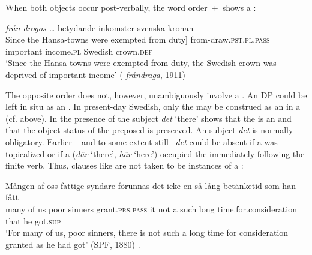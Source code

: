 \documentclass[output=paper]{langscibook}
\begin{document}
When both objects occur post-verbally, the word order \,+\, shows a :

\ea%
    \label{ex:falk:10}
    \gll {{\ob}Genom Hansestädernas tullfrihet]} \textit{från-drogos …} betydande   inkomster  svenska    kronan \\
    {{\ob}Since the Hansa-towns were exempted from duty]}   from-draw\textsc{.pst.pl}.\textsc{pass}    important   income\textsc{.pl}  Swedish   crown.\textsc{def}\\
\glt ‘Since the Hansa-towns were exempted from duty, the Swedish crown was deprived of important income’ ( \textit{fråndraga}, 1911)
\z


The opposite order does not, however, unambiguously involve a . An  DP could be left in situ as an . In present-day Swedish, only the  may be construed as an  in a  (cf.  above). In  the presence of {the  subject \textit{det} ‘there’} shows that the  is an  and that the object status of the preposed  is preserved. An  subject \textit{det} is normally obligatory. Earlier – and to some extent still– \textit{det} could be absent if a  was topicalized or if a   (\textit{där} ‘there’, \textit{här} ‘here’) occupied the  immediately following the finite verb. Thus, clauses like  are not taken to be instances of a :

\ea%
    \label{ex:falk:11}
\ea\label{ex:falk:11a}
\gll Mången  af  oss  fattige  syndare  förunnas      det  icke  en  så    lång  betänketid            som  han  fått\\
many    of  us    poor    sinners    grant\textsc{.prs}.\textsc{pass}     it    not  a  such  long      time.for.consideration  that  he    got\textsc{.sup}\footnotemark{}\\
\glt ‘For many of us, poor sinners, there is not such a long time for consideration granted as he had got’ (SPF, 1880)
.
\end{document}
